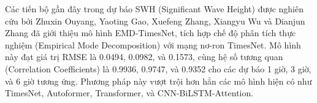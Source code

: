 Các tiến bộ gần đây trong dự báo SWH (Significant Wave Height) được nghiên cứu bởi Zhuxin Ouyang, Yaoting Gao, Xuefeng Zhang, Xiangyu Wu và Dianjun Zhang\cite{timesnet} đã giới thiệu mô hình EMD-TimesNet, tích hợp chế độ phân tích thực nghiệm (Empirical Mode Decomposition) với mạng nơ-ron TimesNet. Mô hình này đạt giá trị RMSE là 0.0494, 0.0982, và 0.1573, cùng hệ số tương quan (Correlation Coefficients) là 0.9936, 0.9747, và 0.9352 cho các dự báo 1 giờ, 3 giờ, và 6 giờ tương ứng. Phương pháp này vượt trội hơn hẳn các mô hình hiện có như TimesNet, Autoformer, Transformer, và CNN-BiLSTM-Attention.